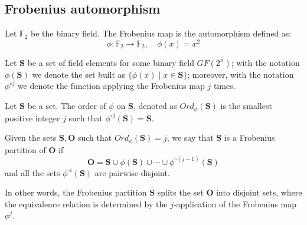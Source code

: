 \subsection{Frobenius automorphism}
    \begin{definition}
    Let $\mathds{F}_2$ be the binary field. The Frobenius map is the automorphism defined as:
    \begin{equation}
        \phi : \mathds{F}_2 \rightarrow \mathds{F}_2, \quad \phi(x) = x^2
    \end{equation}
    \end{definition}
    Let $\mathbf{S}$ be a set of field elements for some binary field $GF(2^n)$; with the notation $\phi(\mathbf{S})$ we denote the set built as $\{\phi(x) \mid x \in \mathbf{S}\}$;
    moreover, with the notation $\phi^{\circ j}$ we denote the function applying the Frobenius map $j$ times.

    \begin{definition}
        Let $\mathbf{S}$ be a set. The order of $\phi$ on $\mathbf{S}$, denoted as $Ord_{\phi}(\mathbf{S})$ is the smallest positive integer $j$ such that $\phi^{\circ j}(\mathbf{S}) = \mathbf{S}$.
    \end{definition}
    \newpage
    \begin{definition}
        Given the sets $\mathbf{S}, \mathbf{O}$ such that $Ord_{\phi}(\mathbf{S})=j$, we say that $\mathbf{S}$ is a Frobenius partition
        of $\mathbf{O}$ if
        \begin{equation}
            \mathbf{O} = \mathbf{S} \cup \phi(\mathbf{S}) \cup \cdots \cup \phi^{\circ (j-1)}(\mathbf{S})
        \end{equation}
        and all the sets $\phi^{\circ i}(\mathbf{S})$ are pairwise disjoint.

        In other words, the Frobenius partition $\mathbf{S}$ splits the set $\mathbf{O}$ into disjoint sets, where the equivalence relation is determined
        by the $j$-application of the Frobenius map $\phi^j$.
    \end{definition}